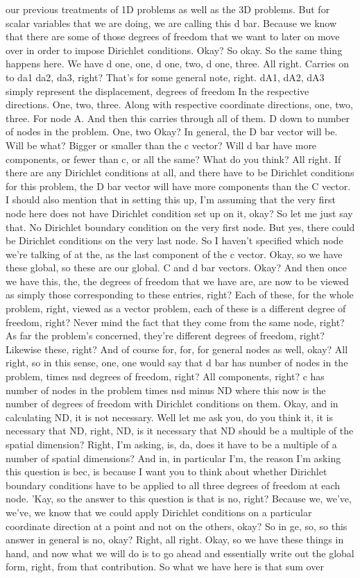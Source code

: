\documentclass[10pt]{article}
\begin{document}
our previous treatments of 1D problems as well as the 3D problems. But for scalar variables that we are doing, we are calling this d bar. Because we know that there are some of those degrees of freedom that we want to later on move over in order to impose Dirichlet conditions. Okay? So okay. So the same thing happens here. We have d one, one, d one, two, d one, three. All right. Carries on to da1 da2, da3, right? That's for some general note, right. dA1, dA2, dA3 simply represent the displacement, degrees of freedom In the respective directions. One, two, three. Along with respective coordinate directions, one, two, three. For node A. And then this carries through all of them. D down to number of nodes in the problem. One, two Okay? In general, the D bar vector will be. Will be what? Bigger or smaller than the c vector? Will d bar have more components, or fewer than c, or all the same? What do you think? All right. If there are any Dirichlet conditions at all, and there have to be Dirichlet conditions for this problem, the D bar vector will have more components than the C vector. I should also mention that in setting this up, I'm assuming that the very first node here does not have Dirichlet condition set up on it, okay? So let me just say that. No Dirichlet boundary condition on the very first node. But yes, there could be Dirichlet conditions on the very last node. So I haven't specified which node we're talking of at the, as the last component of the c vector. Okay, so we have these global, so these are our global. C and d bar vectors. Okay? And then once we have this, the, the degrees of freedom that we have are, are now to be viewed as simply those corresponding to these entries, right? Each of these, for the whole problem, right, viewed as a vector problem, each of these is a different degree of freedom, right? Never mind the fact that they come from the same node, right? As far the problem's concerned, they're different degrees of freedom, right? Likewise these, right? And of course for, for, for general nodes as well, okay? All right, so in this sense, one, one would say that d bar has number of nodes in the problem, times nsd degrees of freedom, right? All components, right? c has number of nodes in the problem times nsd minus ND where this now is the number of degrees of freedom with Dirichlet conditions on them. Okay, and in calculating ND, it is not necessary. Well let me ask you, do you think it, it is necessary that ND, right, ND, is it necessary that ND should be a multiple of the spatial dimension? Right, I'm asking, is, da, does it have to be a multiple of a number of spatial dimensions? And in, in particular I'm, the reason I'm asking this question is bec, is because I want you to think about whether Dirichlet boundary conditions have to be applied to all three degrees of freedom at each node. 'Kay, so the answer to this question is that is no, right? Because we, we've, we've, we know that we could apply Dirichlet conditions on a particular coordinate direction at a point and not on the others, okay? So in ge, so, so this answer in general is no, okay? Right, all right. Okay, so we have these things in hand, and now what we will do is to go ahead and essentially write out the global form, right, from that contribution. So what we have here is that sum over 
\end{document}
